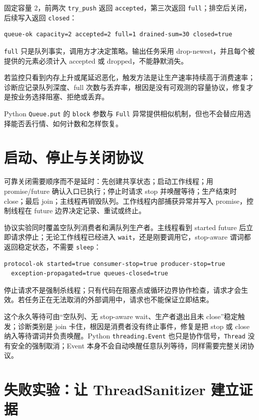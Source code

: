  固定容量 2，前两次 \texttt{try\_push} 返回 \texttt{accepted}，第三次返回 \texttt{full}；排空后关闭，后续写入返回 \texttt{closed}：

\begin{lstlisting}[numbers=none]
queue-ok capacity=2 accepted=2 full=1 drained-sum=30 closed=true
\end{lstlisting}

\texttt{full} 只是队列事实，调用方才决定策略。输出任务采用 drop-newest，并且每个被提供的元素必须计入 accepted 或 dropped，不能静默消失。

若监控只看到内存上升或尾延迟恶化，触发方法是让生产速率持续高于消费速率；诊断应记录队列深度、full 次数与丢弃率，根因是没有可观测的容量协议，修复才是按业务选择阻塞、拒绝或丢弃。

Python \texttt{Queue.put} 的 \texttt{block} 参数与 \texttt{Full} 异常提供相似机制，但也不会替应用选择能否丢行情、如何计数和怎样恢复。

\section{启动、停止与关闭协议}

可靠关闭需要顺序而不是延时：先创建共享状态；启动工作线程；用 promise/future 确认入口已执行；停止时请求 stop 并唤醒等待；生产结束时 close；最后 join；主线程再销毁队列。工作线程内部捕获异常并写入 promise，控制线程在 future 边界决定记录、重试或终止。

协议实验同时覆盖空队列消费者和满队列生产者。主线程看到 started future 后立即请求停止；无论工作线程已经进入 \texttt{wait}，还是刚要调用它，stop-aware 谓词都返回稳定状态，不需要 \texttt{sleep}：

\begin{lstlisting}[numbers=none]
protocol-ok started=true consumer-stop=true producer-stop=true
  exception-propagated=true queues-closed=true
\end{lstlisting}

停止请求不是强制杀线程；只有代码在阻塞点或循环边界协作检查，请求才会生效。若任务正在无法取消的外部调用中，请求也不能保证立即结束。

这个永久等待可由“空队列、无 stop-aware wait、生产者退出且未 close”稳定触发；诊断类别是 join 卡住，根因是消费者没有终止事件，修复是把 stop 或 close 纳入等待谓词并负责唤醒。Python \texttt{threading.Event} 也只是协作信号，\texttt{Thread} 没有安全的强制取消；Event 本身不会自动唤醒任意队列等待，同样需要完整关闭协议。

\section{失败实验：让 ThreadSanitizer 建立证据}

